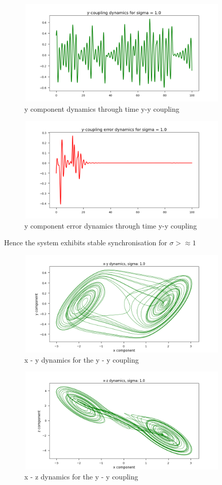 \documentclass{article}
\begin{document}
\begin{figure}[H]
\centering
\includegraphics[width = 4in, height = 2in]{y_coupled_y_dynamics_s1.png}
\caption{y component dynamics through time y-y coupling}
\end{figure}

\begin{figure}[H]
\centering
\includegraphics[width = 4in, height = 2in]{y_coupled_y_error_s1.png}
\caption{y component error dynamics through time y-y coupling}
\end{figure}

Hence the system exhibits stable synchronisation for $\sigma >\approx 1$

\begin{figure}[H]
\centering
\includegraphics[width = 4in, height = 2in]{y_coupled_s1_xy.png}
\caption{x - y dynamics for the y - y coupling}
\end{figure}

\begin{figure}[H]
\centering
\includegraphics[width = 4in, height = 2in]{y_coupled_s1_xz.png}
\caption{x - z dynamics for the y - y coupling}
\end{figure}
\end{document}

